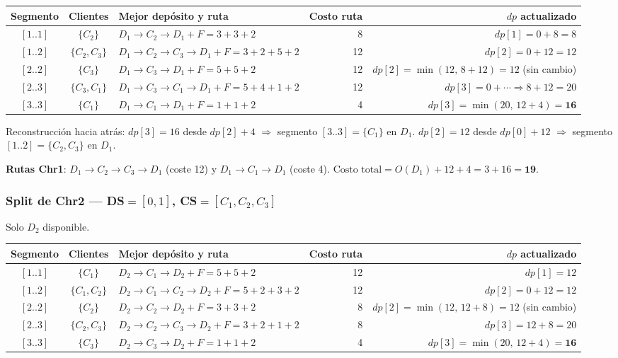 \documentclass[12pt,a4paper]{article}
\begin{document}
\begin{center}
\begin{tabular}{cclrr}
\toprule
Segmento & Clientes & Mejor depósito y ruta & Costo ruta & $dp$ actualizado \\
\midrule
$[1..1]$ & $\{C_2\}$     & $D_1\!\to\!C_2\!\to\!D_1+F=3+3+2$         & 8  & $dp[1]=0+8=8$ \\
$[1..2]$ & $\{C_2,C_3\}$ & $D_1\!\to\!C_2\!\to\!C_3\!\to\!D_1+F=3+2+5+2$ & 12 & $dp[2]=0+12=12$ \\
$[2..2]$ & $\{C_3\}$     & $D_1\!\to\!C_3\!\to\!D_1+F=5+5+2$         & 12 & $dp[2]=\min(12,\,8+12)=12$ (sin cambio) \\
$[2..3]$ & $\{C_3,C_1\}$ & $D_1\!\to\!C_3\!\to\!C_1\!\to\!D_1+F=5+4+1+2$ & 12 & $dp[3]=0+\cdots\Rightarrow8+12=20$ \\
$[3..3]$ & $\{C_1\}$     & $D_1\!\to\!C_1\!\to\!D_1+F=1+1+2$         & 4  & $dp[3]=\min(20,\,12+4)=\mathbf{16}$ \\
\bottomrule
\end{tabular}
\end{center}

Reconstrucción hacia atrás:
$dp[3]=16$ desde $dp[2]+4$ $\Rightarrow$ segmento $[3..3]=\{C_1\}$ en $D_1$.
$dp[2]=12$ desde $dp[0]+12$ $\Rightarrow$ segmento $[1..2]=\{C_2,C_3\}$ en $D_1$.

\textbf{Rutas Chr1}: $D_1\!\to\!C_2\!\to\!C_3\!\to\!D_1$ (coste 12) y $D_1\!\to\!C_1\!\to\!D_1$ (coste 4).
$\text{Costo total} = O(D_1) + 12 + 4 = 3 + 16 = \mathbf{19}$.

\subsubsection*{Split de Chr2 — DS$=[0,1]$, CS$=[C_1,C_2,C_3]$}

Solo $D_2$ disponible.

\begin{center}
\begin{tabular}{cclrr}
\toprule
Segmento & Clientes & Mejor depósito y ruta & Costo ruta & $dp$ actualizado \\
\midrule
$[1..1]$ & $\{C_1\}$     & $D_2\!\to\!C_1\!\to\!D_2+F=5+5+2$           & 12 & $dp[1]=12$ \\
$[1..2]$ & $\{C_1,C_2\}$ & $D_2\!\to\!C_1\!\to\!C_2\!\to\!D_2+F=5+2+3+2$& 12 & $dp[2]=0+12=12$ \\
$[2..2]$ & $\{C_2\}$     & $D_2\!\to\!C_2\!\to\!D_2+F=3+3+2$           & 8  & $dp[2]=\min(12,\,12+8)=12$ (sin cambio) \\
$[2..3]$ & $\{C_2,C_3\}$ & $D_2\!\to\!C_2\!\to\!C_3\!\to\!D_2+F=3+2+1+2$& 8  & $dp[3]=12+8=20$ \\
$[3..3]$ & $\{C_3\}$     & $D_2\!\to\!C_3\!\to\!D_2+F=1+1+2$           & 4  & $dp[3]=\min(20,\,12+4)=\mathbf{16}$ \\
\bottomrule
\end{tabular}
\end{center}
\end{document}
